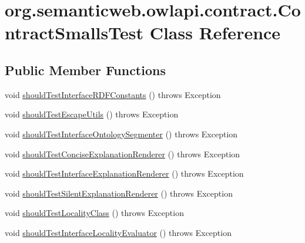 \hypertarget{classorg_1_1semanticweb_1_1owlapi_1_1contract_1_1_contract_smalls_test}{\section{org.\-semanticweb.\-owlapi.\-contract.\-Contract\-Smalls\-Test Class Reference}
\label{classorg_1_1semanticweb_1_1owlapi_1_1contract_1_1_contract_smalls_test}
}
\subsection*{Public Member Functions}
\begin{DoxyCompactItemize}
\item 
void \hyperlink{classorg_1_1semanticweb_1_1owlapi_1_1contract_1_1_contract_smalls_test_a360de14268b3cf7ec18742f9fc290b5f}{should\-Test\-Interface\-R\-D\-F\-Constants} ()  throws Exception 
\item 
void \hyperlink{classorg_1_1semanticweb_1_1owlapi_1_1contract_1_1_contract_smalls_test_adb954c055cb2d8aa8f75c75e0d427ba5}{should\-Test\-Escape\-Utils} ()  throws Exception 
\item 
void \hyperlink{classorg_1_1semanticweb_1_1owlapi_1_1contract_1_1_contract_smalls_test_af7f96965c972061a959f28bc795a59fd}{should\-Test\-Interface\-Ontology\-Segmenter} ()  throws Exception 
\item 
void \hyperlink{classorg_1_1semanticweb_1_1owlapi_1_1contract_1_1_contract_smalls_test_ac3db179255f9d0bf4e253b5bdbbdf964}{should\-Test\-Concise\-Explanation\-Renderer} ()  throws Exception 
\item 
void \hyperlink{classorg_1_1semanticweb_1_1owlapi_1_1contract_1_1_contract_smalls_test_a9cef9651d3eb44622c1f2ddd4b6e6f23}{should\-Test\-Interface\-Explanation\-Renderer} ()  throws Exception 
\item 
void \hyperlink{classorg_1_1semanticweb_1_1owlapi_1_1contract_1_1_contract_smalls_test_adf4387f3041988015659863950126471}{should\-Test\-Silent\-Explanation\-Renderer} ()  throws Exception 
\item 
void \hyperlink{classorg_1_1semanticweb_1_1owlapi_1_1contract_1_1_contract_smalls_test_a3941ec90c344c6c9b2f2052c8731123f}{should\-Test\-Locality\-Class} ()  throws Exception 
\item 
void \hyperlink{classorg_1_1semanticweb_1_1owlapi_1_1contract_1_1_contract_smalls_test_a5ef4f37455c9aeb0d31c182f2d8e1364}{should\-Test\-Interface\-Locality\-Evaluator} ()  throws Exception 

\end{DoxyCompactItemize}
